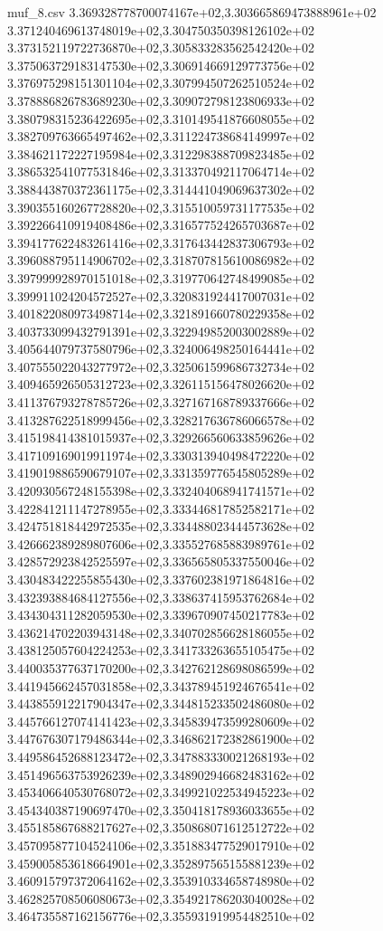 \begin{filecontents*}{muf_8.csv}
3.369328778700074167e+02,3.303665869473888961e+02
3.371240469613748019e+02,3.304750350398126102e+02
3.373152119722736870e+02,3.305833283562542420e+02
3.375063729183147530e+02,3.306914669129773756e+02
3.376975298151301104e+02,3.307994507262510524e+02
3.378886826783689230e+02,3.309072798123806933e+02
3.380798315236422695e+02,3.310149541876608055e+02
3.382709763665497462e+02,3.311224738684149997e+02
3.384621172227195984e+02,3.312298388709823485e+02
3.386532541077531846e+02,3.313370492117064714e+02
3.388443870372361175e+02,3.314441049069637302e+02
3.390355160267728820e+02,3.315510059731177535e+02
3.392266410919408486e+02,3.316577524265703687e+02
3.394177622483261416e+02,3.317643442837306793e+02
3.396088795114906702e+02,3.318707815610086982e+02
3.397999928970151018e+02,3.319770642748499085e+02
3.399911024204572527e+02,3.320831924417007031e+02
3.401822080973498714e+02,3.321891660780229358e+02
3.403733099432791391e+02,3.322949852003002889e+02
3.405644079737580796e+02,3.324006498250164441e+02
3.407555022043277972e+02,3.325061599686732734e+02
3.409465926505312723e+02,3.326115156478026620e+02
3.411376793278785726e+02,3.327167168789337666e+02
3.413287622518999456e+02,3.328217636786066578e+02
3.415198414381015937e+02,3.329266560633859626e+02
3.417109169019911974e+02,3.330313940498472220e+02
3.419019886590679107e+02,3.331359776545805289e+02
3.420930567248155398e+02,3.332404068941741571e+02
3.422841211147278955e+02,3.333446817852582171e+02
3.424751818442972535e+02,3.334488023444573628e+02
3.426662389289807606e+02,3.335527685883989761e+02
3.428572923842525597e+02,3.336565805337550046e+02
3.430483422255855430e+02,3.337602381971864816e+02
3.432393884684127556e+02,3.338637415953762684e+02
3.434304311282059530e+02,3.339670907450217783e+02
3.436214702203943148e+02,3.340702856628186055e+02
3.438125057604224253e+02,3.341733263655105475e+02
3.440035377637170200e+02,3.342762128698086599e+02
3.441945662457031858e+02,3.343789451924676541e+02
3.443855912217904347e+02,3.344815233502486080e+02
3.445766127074141423e+02,3.345839473599280609e+02
3.447676307179486344e+02,3.346862172382861900e+02
3.449586452688123472e+02,3.347883330021268193e+02
3.451496563753926239e+02,3.348902946682483162e+02
3.453406640530768072e+02,3.349921022534945223e+02
3.454340387190697470e+02,3.350418178936033655e+02
3.455185867688217627e+02,3.350868071612512722e+02
3.457095877104524106e+02,3.351883477529017910e+02
3.459005853618664901e+02,3.352897565155881239e+02
3.460915797372064162e+02,3.353910334658748980e+02
3.462825708506080673e+02,3.354921786203040028e+02
3.464735587162156776e+02,3.355931919954482510e+02

\end{filecontents*}
